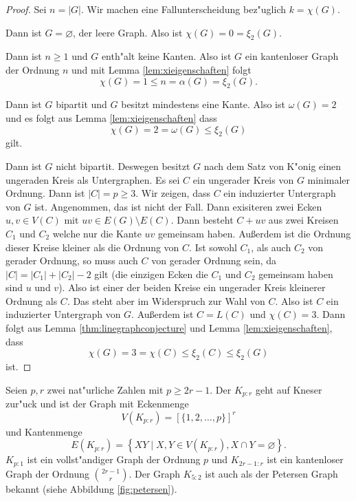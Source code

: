 \begin{proof}
  Sei $n=|G|$. Wir machen eine Fallunterscheidung bez"uglich $k=\chi(G)$.

   Dann ist $G=\varnothing$, der leere Graph. Also ist $\chi(G) = 0 = \xi_{2}(G)$. 

   Dann ist $n\geq 1$ und $G$ enth"alt keine Kanten. Also ist $G$ ein kantenloser Graph der Ordnung $n$ und mit Lemma \ref{lem:xieigenschaften} folgt
  $$\chi(G) = 1 \leq n = \alpha(G) = \xi_{2}(G).$$

   Dann ist $G$ bipartit und $G$ besitzt mindestens eine Kante. Also ist $\omega(G) = 2$ und es folgt aus Lemma \ref{lem:xieigenschaften} dass
  $$\chi(G) = 2 = \omega(G) \leq \xi_{2}(G)$$
gilt.

   Dann ist $G$ nicht bipartit. Deswegen besitzt $G$ nach dem Satz von K"onig einen ungeraden Kreis als Untergraphen. Es sei $C$ ein ungerader Kreis von $G$ minimaler Ordnung. Dann ist $|C| = p \geq 3$. 
  Wir zeigen, dass $C$ ein induzierter Untergraph von $G$ ist. Angenommen, das ist nicht der Fall. Dann exisiteren zwei Ecken $u,v\in V(C)$ mit $uv\in E(G) \setminus E(C)$. Dann besteht $C+uv$ aus zwei Kreisen $C_1$ und $C_2$ welche nur die Kante $uv$ gemeinsam haben. Au{\ss}erdem ist die Ordnung dieser Kreise kleiner als die Ordnung von $C$.
  Ist sowohl $C_1$, als auch $C_2$ von gerader Ordnung, so muss auch $C$ von gerader Ordnung sein, da $|C| = |C_1| + |C_2| -2$ gilt (die einzigen Ecken die $C_1$ und $C_2$ gemeinsam haben sind $u$ und $v$). Also ist einer der beiden Kreise ein ungerader Kreis kleinerer Ordnung als $C$. Das steht aber im Widerspruch zur Wahl von $C$. 
  Also ist $C$ ein induzierter Untergraph von $G$. Au{\ss}erdem ist $C=L(C)$ und $\chi(C) = 3$. Dann folgt aus Lemma \ref{thm:linegraphconjecture} und Lemma \ref{lem:xieigenschaften}, dass 
  $$\chi(G) = 3 = \chi(C) \leq \xi_{2}(C) \leq \xi_{2}(G)$$
  ist.
\end{proof}


Seien $p,r$ zwei nat"urliche Zahlen mit $p\geq 2r-1$. Der  $K_{p:r}$ geht auf Kneser \cite{Kneser55} zur"uck und ist der Graph mit Eckenmenge $$V(K_{p:r}) = [\{1,2,\dots,p\}]^{r}$$ und Kantenmenge 
$$E(K_{p:r}) = \left\{ XY\;|\; X,Y \in V(K_{p:r}), X \cap Y = \varnothing \right\}.$$ 
$K_{p:1}$ ist ein vollst"andiger Graph der Ordnung $p$ und $K_{2r-1:r}$ ist ein kantenloser Graph der Ordnung $\binom{2r-1}{r}$.
Der Graph $K_{5:2}$ ist auch als der Petersen Graph bekannt (siehe Abbildung \ref{fig:petersen}).

